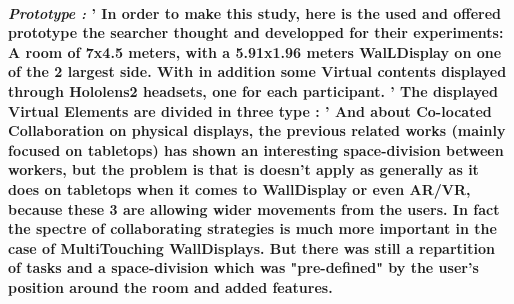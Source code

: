 \documentclass{article}
\begin{document}
    \paragraph{ \textit{Prototype :}
                \newline
                \textnormal{'   In order to make this study, here is the used and offered prototype the searcher thought and developped for their experiments:
                A room of 7x4.5 meters, with a 5.91x1.96 meters WalLDisplay on one of the 2 largest side. With in addition some Virtual contents displayed through Hololens2 headsets, one for each participant.}
                \newline
                \textnormal{'   The displayed \textbf{Virtual Elements} are divided in three type :}
                \newline
                \textnormal{'   And about Co-located Collaboration on physical displays, the previous related works (mainly focused on tabletops) has shown an interesting space-division between workers, but the
                problem is that is doesn't apply as generally as it does on tabletops when it comes to WallDisplay or even AR/VR, because these 3 are allowing wider movements from the users. In fact the spectre of 
                collaborating strategies is much more important in the case of MultiTouching WallDisplays. But there was still a repartition of tasks and a space-division which was "pre-defined" by the user's position
                around the room and added features.}}
\end{document}
